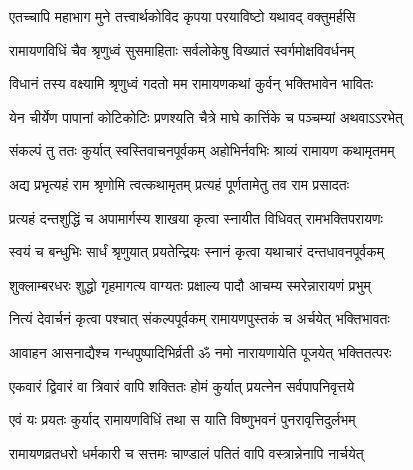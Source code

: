  

\twolineshloka
{एतच्चापि महाभाग मुने तत्त्वार्थकोविद}
{कृपया परयाविष्टो यथावद् वक्तुमर्हसि}%

 


\twolineshloka
{रामायणविधिं चैव श्रृणुध्वं सुसमाहिताः}
{सर्वलोकेषु विख्यातं स्वर्गमोक्षविवर्धनम्}%

 

\twolineshloka
{विधानं तस्य वक्ष्यामि श्रृणुध्वं गदतो मम}
{रामायणकथां कुर्वन् भक्तिभावेन भावितः}%

 

\twolineshloka
{येन चीर्येण पापानां कोटिकोटिः प्रणश्यति}
{चैत्रे माघे कार्त्तिके च पञ्चम्यां अथवाऽऽरभेत्}%

 

\twolineshloka
{संकल्पं तु ततः कुर्यात् स्वस्तिवाचनपूर्वकम्}
{अहोभिर्नवभिः श्राव्यं रामायण कथामृतमम्}%

 

\twolineshloka
{अद्य प्रभृत्यहं राम श्रृणोमि त्वत्कथामृतम्}
{प्रत्यहं पूर्णतामेतु तव राम प्रसादतः}%

 

\twolineshloka
{प्रत्यहं दन्तशुद्धिं च अपामार्गस्य शाखया}
{कृत्वा स्नायीत विधिवत् रामभक्तिपरायणः}%

 

\twolineshloka
{स्वयं च बन्धुभिः सार्धं श्रृणुयात् प्रयतेन्द्रियः}
{स्नानं कृत्वा यथाचारं दन्तधावनपूर्वकम्}%

 

\twolineshloka
{शुक्लाम्बरधरः शुद्धो गृहमागत्य वाग्यतः}
{प्रक्षाल्य पादौ आचम्य स्मरेन्नारायणं प्रभुम्}%

 

\twolineshloka
{नित्यं देवार्चनं कृत्वा पश्चात् संकल्पपूर्वकम्}
{रामायणपुस्तकं च अर्चयेत् भक्तिभावतः}%

 

\twolineshloka
{आवाहन आसनाद्यैश्च गन्धपुष्पादिभिर्व्रती}
{ॐ नमो नारायणायेति पूजयेत् भक्तितत्परः}%

 

\twolineshloka
{एकवारं द्विवारं वा त्रिवारं वापि शक्तितः}
{होमं कुर्यात् प्रयत्‍नेन सर्वपापनिवृत्तये}%

 

\twolineshloka
{एवं यः प्रयतः कुर्याद् रामायणविधिं तथा}
{स याति विष्णुभवनं पुनरावृत्तिदुर्लभम्}%

 

\twolineshloka
{रामायणव्रतधरो धर्मकारी च सत्तमः}
{चाण्डालं पतितं वापि वस्त्रान्नेनापि नार्चयेत्}%

